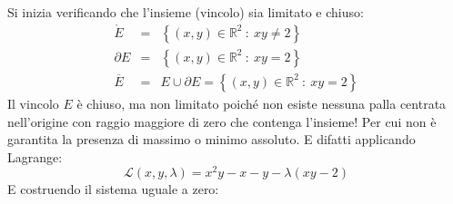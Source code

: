 \documentclass[a4paper]{article}
\begin{document}
	\noindent
	Si inizia verificando che l'insieme (vincolo) sia limitato e chiuso:
	\begin{equation*}
		\begin{array}{rcl}
			\mathring{E} &=& \left\{\left(x,y\right) \in \mathbb{R}^{2} \: : \: xy \ne 2\right\} \\ [.3em]
			\partial E &=& \left\{\left(x,y\right) \in \mathbb{R}^{2} \: : \: xy = 2\right\} \\ [.3em]
			\overline{E} &=& E \cup \partial E = \left\{\left(x,y\right) \in \mathbb{R}^{2} \: : \: xy = 2\right\}
		\end{array}
	\end{equation*}
	Il vincolo $E$ è chiuso, ma non limitato poiché non esiste nessuna palla centrata nell'origine con raggio maggiore di zero che contenga l'insieme! Per cui non è garantita la presenza di massimo o minimo assoluto. E difatti applicando Lagrange:
	\begin{equation*}
		\mathcal{L}\left(x,y,\lambda\right) = x^{2}y - x -y - \lambda\left(xy-2\right)
	\end{equation*}
	E costruendo il sistema uguale a zero:
\end{document}
